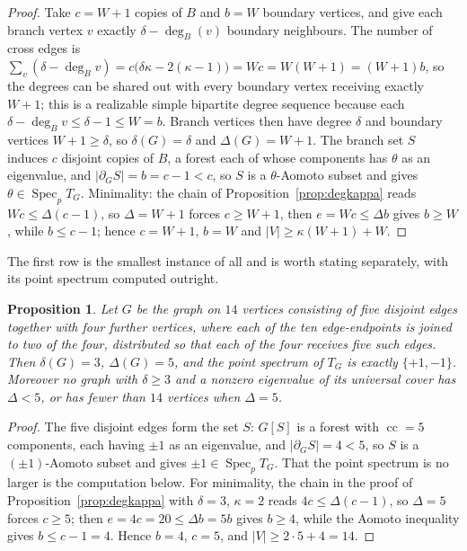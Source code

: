\documentclass[11pt]{article}
\newtheorem{proposition}[theorem]{Proposition}
\theoremstyle{remark}
\begin{document}
\begin{proof}
Take $c=W+1$ copies of $B$ and $b=W$ boundary vertices, and give each branch vertex $v$ exactly
$\delta-\deg_B(v)$ boundary neighbours. The number of cross edges is
$\sum_v(\delta-\deg_B v)=c\bigl(\delta\kappa-2(\kappa-1)\bigr)=Wc=W(W+1)=(W+1)b$, so the
degrees can be shared out with every boundary vertex receiving exactly $W+1$; this is a realizable
simple bipartite degree sequence because each $\delta-\deg_B v\le\delta-1\le W=b$. Branch vertices
then have degree $\delta$ and boundary vertices $W+1\ge\delta$, so $\delta(G)=\delta$ and
$\Delta(G)=W+1$. The branch set $S$ induces $c$ disjoint copies of $B$, a forest each of whose
components has $\theta$ as an eigenvalue, and $|\partial_GS|=b=c-1<c$, so $S$ is a
$\theta$-Aomoto subset and \cite{BGM} gives $\theta\in\operatorname{Spec}_pT_G$. Minimality: the
chain of Proposition~\ref{prop:degkappa} reads $Wc\le\Delta(c-1)$, so $\Delta=W+1$ forces
$c\ge W+1$, then $e=Wc\le\Delta b$ gives $b\ge W$, while $b\le c-1$; hence $c=W+1$, $b=W$ and
$|V|\ge\kappa(W+1)+W$.
\end{proof}

The first row is the smallest instance of all and is worth stating separately, with its point
spectrum computed outright.

\begin{proposition}\label{prop:sharp}
Let $G$ be the graph on $14$ vertices consisting of five disjoint edges together with four further
vertices, where each of the ten edge-endpoints is joined to two of the four, distributed so that
each of the four receives five such edges. Then $\delta(G)=3$, $\Delta(G)=5$, and the point spectrum
of $T_G$ is exactly $\{+1,-1\}$. Moreover no graph with $\delta\ge3$ and a nonzero eigenvalue of its
universal cover has $\Delta<5$, or has fewer than $14$ vertices when $\Delta=5$.
\end{proposition}

\begin{proof}
The five disjoint edges form the set $S$: $G[S]$ is a forest with $\operatorname{cc}=5$ components,
each having $\pm1$ as an eigenvalue, and $|\partial_GS|=4<5$, so $S$ is a $(\pm1)$-Aomoto subset and
\cite{BGM} gives $\pm1\in\operatorname{Spec}_p T_G$. That the point spectrum is no larger is the
computation below. For minimality, the chain in the proof of Proposition~\ref{prop:degkappa} with
$\delta=3$, $\kappa=2$ reads $4c\le\Delta(c-1)$, so $\Delta=5$ forces $c\ge5$; then
$e=4c=20\le\Delta b=5b$ gives $b\ge4$, while the Aomoto inequality gives $b\le c-1=4$. Hence $b=4$,
$c=5$, and $|V|\ge 2\cdot5+4=14$.
\end{proof}
\end{document}
